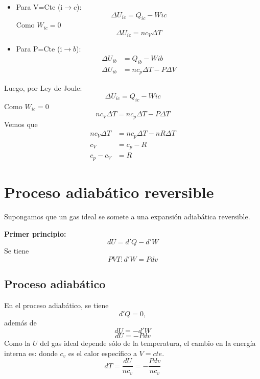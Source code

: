 \documentclass[12pt,twocolumn,a4paper]{report}
\begin{document}
\begin{itemize}
\setlength\itemsep{0.001cm}
\item{Para V=Cte (i$\rightarrow c$): 
\begin{equation*}
\Delta U_{ic} = Q_{ic} - W{ic} 
\end{equation*}
Como $W_{ic} = 0$
\begin{equation*}
\Delta U_{ic} = nc_V \Delta T
\end{equation*}}
\item{Para P=Cte (i$\rightarrow b$): 
\begin{align*}
\Delta U_{ib} &= Q_{ib} - W{ib} \\
\Delta U_{ib} &= nc_p \Delta T - P\Delta V
\end{align*}}
\end{itemize}
Luego, por Ley de Joule: 
\begin{equation*}
\Delta U_{ic} = Q_{ic} - W{ic} 
\end{equation*}
Como $W_{ic} = 0$
\begin{equation*}
nc_V\Delta T = nc_p \Delta T - P\Delta T 
\end{equation*}
Vemos que 
\begin{align*}
nc_V\Delta T &= nc_p \Delta T - nR\Delta T \\
c_V &= c_p - R \\
c_p - c_V &= R
\end{align*}

\chapter*{Proceso adiabático reversible}

Supongamos que un gas ideal se somete a una expansión adiabática reversible. 

\textbf{Primer principio:} 
\begin{equation*}
dU = d'Q - d'W
\end{equation*}
Se tiene 
\begin{equation*}
PVT : d'W = P dv 
\end{equation*}

\section*{Proceso adiabático}
En el proceso adiabático, se tiene $$d'Q = 0, $$ además de $$ dU = -d'W $$ $$ dU = -Pdv  $$
Como la $U$ del gas ideal depende sólo de la temperatura, el cambio en la energía interna es:
\vspace{5px}
donde $c_v$ es el calor específico a $V = cte$. 
$$ dT = \dfrac{dU}{nc_v} = -\dfrac{Pdv}{nc_v} $$
\end{document}
